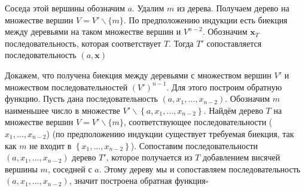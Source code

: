 \documentclass[a4paper]{article}
\newcommand{\qed}{\hfill$\square$}
\begin{document}
Соседа этой вершины обозначим $a$. Удалим $m$ из дерева. Получаем дерево на множестве вершин $V=V' \backslash\{m\}$. По предположению индукции 
есть биекция между деревьями на таком множестве вершин и $V^{n-2}$. Обозначим $\boldsymbol{x}_{T}$ последовательность, которая соответствует $T$. 
Тогда $T'$ сопоставляется последовательность $(a, \boldsymbol{x})$

Докажем, что получена биекция между деревьями с множеством вершин $V'$ и множеством последовательностей $\left(V'\right)^{n-1}$. 
Для этого построим обратную функцию. Пусть дана последовательность $\left(a, x_{1}, \ldots, x_{n-2}\right)$. Обозначим $m$ наименьшее число в множестве 
$V' \backslash\left\{a, x_{1}, \ldots, x_{n-2}\right\}$. Найдём дерево $T$ на множестве вершин $V=V' \backslash\{m\}$, соответствующее 
последовательности ($x_{1}, \ldots, x_{n-2}$) (по предположению индукции существует требуемая биекция, так как $m$ не входит в 
$\left\{x_{1}, \ldots, x_{n-2}\right\}$). Сопоставим последовательности $\left(a, x_{1}, \ldots, x_{n-2}\right)$ дерево $T'$, 
которое получается из $T$ добавлением висячей вершины $m$, соседней с $a$. Этому дереву мы и сопоставляем последовательность 
$\left(a, x_{1}, \ldots, x_{n-2}\right)$, значит построена обратная функция\qed
\end{document}
